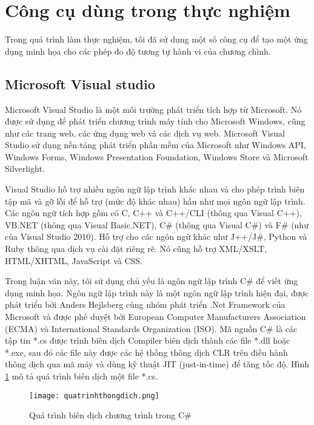 \section{Công cụ dùng trong thực nghiệm}

Trong quá trình làm thực nghiệm, tôi đã sử dụng một số công cụ để tạo một ứng dụng
minh họa cho các phép đo độ tương tự hành vi của chương chình.

\subsection{Microsoft Visual studio}
Microsoft Visual Studio là một môi trường phát triển tích hợp từ Microsoft. Nó được sử dụng để phát triển chương trình máy tính cho Microsoft Windows, cũng như các trang web, các ứng dụng web và các dịch vụ web. Microsoft Visual Studio sử dụng nền tảng phát triển phần mềm của Microsoft như Windows API, Windows Forms, Windows Presentation Foundation, Windows Store và Microsoft Silverlight. 

Visual Studio hỗ trợ nhiều ngôn ngữ lập trình khác nhau và cho phép trình biên tập mã và gỡ lỗi để hỗ trợ (mức độ khác nhau) hầu như mọi ngôn ngữ lập trình. Các ngôn ngữ tích hợp gồm có C, C++ và C++/CLI (thông qua Visual C++), VB.NET (thông qua Visual Basic.NET), C\#  (thông qua Visual C\#) và F\# (như của Visual Studio 2010). Hỗ trợ cho các ngôn ngữ khác như J++/J\#, Python và Ruby thông qua dịch vụ cài đặt riêng rẽ. Nó cũng hỗ trợ XML/XSLT, HTML/XHTML, JavaScript và CSS.

Trong luận văn này, tôi sử dụng chủ yếu là ngôn ngữ lập trình C\# để viết ứng dụng minh họa. Ngôn ngữ lập trình này là một ngôn ngữ lập trình hiện đại, được phát triển bởi Anders Hejlsberg cùng nhóm phát triển .Net Framework của Microsoft và được phê duyệt bởi European Computer Manufacturers Association (ECMA) và International Standards Organization (ISO). Mã nguồn C\# là các tập tin *.cs được trình biên dịch Compiler biên dịch thành các file *.dll hoặc *.exe, sau đó các file này được các hệ thống thông dịch CLR trên điều hành thông dịch qua mã máy và dùng kỹ thuật JIT (just-in-time) để tăng tốc độ. Hình \ref{fig:ProcessCompile} mô tả quá trình biên dịch một file *.cs.


\begin{figure}[H]
	\caption{Quá trình biên dịch chương trình trong C\#}
	\label{fig:ProcessCompile}
	\begin{center}
	  \texttt{[image: quatrinhthongdich.png]}
	\end{center}
\end{figure}


